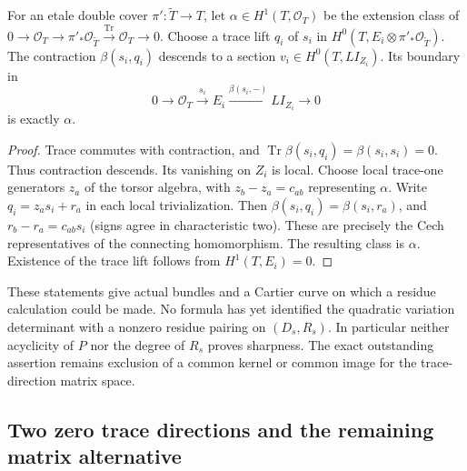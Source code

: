 \begin{lemma}
\label{lem:DE-A3-positive-torsor-boundary}
For an etale double cover $\pi':\widetilde T\to T$, let
$\alpha\in H^1(T,\mathcal O_T)$ be the extension class of
$0\to\mathcal O_T\to\pi'_*\mathcal O_{\widetilde T}
\xrightarrow{\operatorname{Tr}}\mathcal O_T\to0$.
Choose a trace lift $q_i$ of $s_i$ in
$H^0(T,E_i\otimes\pi'_*\mathcal O_{\widetilde T})$.
The contraction $\beta(s_i,q_i)$ descends to a section
$v_i\in H^0(T,L I_{Z_i})$. Its boundary in
\[
 0\longrightarrow\mathcal O_T\xrightarrow{s_i}E_i
       \xrightarrow{\beta(s_i,-)}L I_{Z_i}
       \longrightarrow0
\]
is exactly $\alpha$.
\end{lemma}
\begin{proof}
Trace commutes with contraction, and
$\operatorname{Tr}\beta(s_i,q_i)=\beta(s_i,s_i)=0$.
Thus contraction descends. Its vanishing on $Z_i$ is local.
Choose local trace-one generators $z_a$ of the torsor algebra,
with $z_b-z_a=c_{ab}$ representing $\alpha$.
Write $q_i=z_a s_i+r_a$ in each local trivialization.
Then $\beta(s_i,q_i)=\beta(s_i,r_a)$, and
$r_b-r_a=c_{ab}s_i$ (signs agree in characteristic two).
These are precisely the Cech representatives of the
connecting homomorphism. The resulting class is $\alpha$.
Existence of the trace lift follows from $H^1(T,E_i)=0$.
\end{proof}

\begin{remark}
\label{rem:DE-A3-positive-bundle-scope}
These statements give actual bundles and a Cartier curve on
which a residue calculation could be made. No formula has yet
identified the quadratic variation determinant with a
nonzero residue pairing on $(D_s,R_s)$. In particular neither
acyclicity of $P$ nor the degree of $R_s$ proves sharpness.
The exact outstanding assertion remains exclusion of a common
kernel or common image for the trace-direction matrix space.
\end{remark}


\subsection{Two zero trace directions and the remaining matrix alternative}


